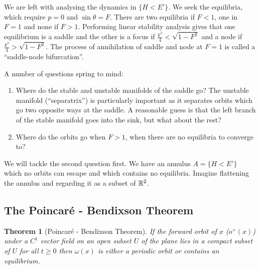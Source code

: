 \documentclass{notes}
\theoremstyle{plain}
\newtheorem*{theorem}{Theorem}
\begin{document}
We are left with analysing the dynamics in $\{ H < E'\}$.  We seek the
equilibria, which require $p = 0$ and $\sin \theta = F$.  There are
two equilibria if $F < 1$, one in $F = 1$ and none if $F > 1$.  Performing
linear stability analysis gives that one equilibrium is a saddle and the
other is a focus if $\frac{k^2}{4} < \sqrt{1 - F^2}$ and a node if
$\frac{k^2}{4} > \sqrt{1 - F^2}$.  The process of annihilation of saddle 
and node at $F=1$ is called a ``saddle-node bifurcation''.

A number of questions spring to mind:

\begin{enumerate}
\item Where do the stable and unstable manifolds of the saddle go?  The
unstable manifold (``separatrix'') is particularly important as it
separates orbits which go two opposite ways at the saddle.  A reasonable
guess is that the left branch of the stable manifold goes into the sink,
but what about the rest?
\item Where do the orbits go when $F > 1$, when there are no equilibria to
converge to?
\end{enumerate}

We will tackle the second question first.  We have an annulus $A
= \{ H < E'\}$ which no orbits can escape and which contains no equilibria.
Imagine flattening the annulus and regarding it as a subset of $\mathbb{R}^2$.

\subsection{The Poincar\'e - Bendixson Theorem}

\begin{theorem}[Poincar\'e - Bendixson Theorem]
If the forward orbit of $x$ ($o^+(x)$) under a $C^1$ vector field on an
open subset $U$ of the plane lies in a compact subset of $U$ for all
$t \ge 0$ then $\omega(x)$ is either a periodic orbit or contains an
equilibrium.
\end{theorem}
\end{document}
